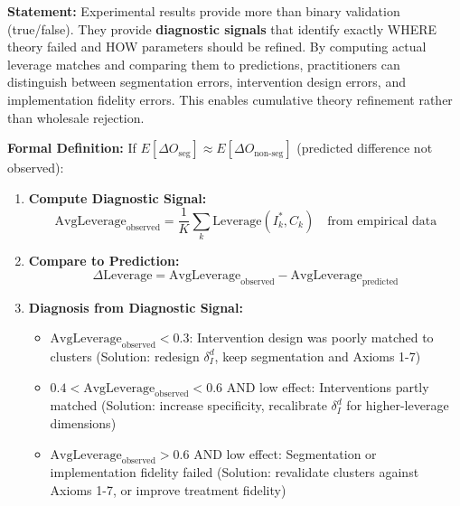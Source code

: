 \vspace{1em}

\begin{tcolorbox}[colback=orange!5!white, colframe=orange!75!black,
    title=Axiom SEG-VAL-12: Diagnostic Refinement Principle]

\textbf{Statement:}
Experimental results provide more than binary validation (true/false). They provide \textbf{diagnostic signals} that
identify exactly WHERE theory failed and HOW parameters should be refined. By computing actual leverage matches
and comparing them to predictions, practitioners can distinguish between segmentation errors, intervention design
errors, and implementation fidelity errors. This enables cumulative theory refinement rather than wholesale rejection.
\cite{button2013power, bland1995multiple, camerer2018evaluating}

\textbf{Formal Definition:}
If $E[\Delta O_{\text{seg}}] \approx E[\Delta O_{\text{non-seg}}]$ (predicted difference not observed):

\begin{enumerate}

\item \textbf{Compute Diagnostic Signal:}
\begin{equation}
\text{AvgLeverage}_{\text{observed}} = \frac{1}{K} \sum_k \text{Leverage}(I_k^*, C_k) \quad \text{from empirical data}
\end{equation}

\item \textbf{Compare to Prediction:}
\begin{equation}
\Delta \text{Leverage} = \text{AvgLeverage}_{\text{observed}} - \text{AvgLeverage}_{\text{predicted}}
\end{equation}

\item \textbf{Diagnosis from Diagnostic Signal:}
\begin{itemize}[nosep]
\item $\text{AvgLeverage}_{\text{observed}} < 0.3$: Intervention design was poorly matched to clusters
  (Solution: redesign $\delta_I^d$, keep segmentation and Axioms 1-7)
\item $0.4 < \text{AvgLeverage}_{\text{observed}} < 0.6$ AND low effect: Interventions partly matched
  (Solution: increase specificity, recalibrate $\delta_I^d$ for higher-leverage dimensions)
\item $\text{AvgLeverage}_{\text{observed}} > 0.6$ AND low effect: Segmentation or implementation fidelity failed
  (Solution: revalidate clusters against Axioms 1-7, or improve treatment fidelity)
\end{itemize}


\end{enumerate}
\end{tcolorbox}
